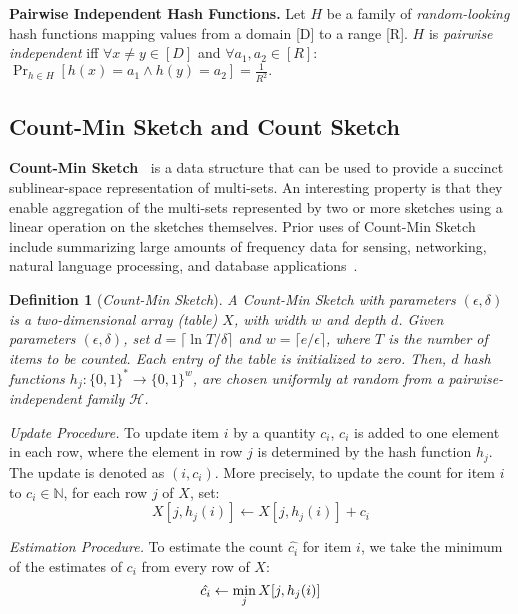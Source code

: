 \documentclass[conference]{IEEEtran}
\newcommand{\descr}[1]{\medskip \noindent \textbf{#1}}
\newcommand{\descrit}[1]{\smallskip \noindent \emph{#1}}
\newtheorem{definition}{Definition}
\begin{document}
\descr{Pairwise Independent Hash Functions.}
Let $H$ be a family of {\em random-looking} 
hash functions mapping values from a domain [D] to a range [R].
$H$ is  {\em pairwise independent} iff $\forall x \neq y \in [D]$ and 
$\forall a_1, a_2 \in [R]$: $ 
\Pr_{h \in H} \left[ h(x) = a_1 \wedge h(y) = a_2 \right] = \frac{1}{R^2}.  $

\subsection{Count-Min Sketch and Count Sketch}
\label{sec:cms}

\descr{Count-Min Sketch~\cite{cormode2005improved}} is a data structure that can be used to provide a succinct sublinear-space representation of multi-sets. An interesting property is that they enable aggregation of the multi-sets represented by two or more sketches using a linear operation on the sketches themselves. Prior uses of Count-Min Sketch include summarizing large amounts of frequency data for sensing, networking, natural language processing, and database applications~\cite{site}.


\vspace*{0.1cm}
\begin{definition}[\itshape  Count-Min Sketch]\label{def:count} 
A Count-Min Sketch with parameters $(\epsilon, \delta)$ is a two-dimensional array (table) $X$, with width $w$ and depth $d$. 
Given parameters $(\epsilon, \delta)$, set $d=\lceil \ln{T/\delta} \rceil$ and $w=\lceil e / \epsilon \rceil$, where $T$ is the number of items to be counted. Each entry of the table is initialized to zero. Then, $d$ hash functions
$ h_j:\lbrace{0,1\rbrace}^* \rightarrow \lbrace{0,1\rbrace}^w$, are chosen uniformly at random from a pairwise-independent family $\mathcal{H}$.\vspace*{-0.15cm}
\end{definition}

\descrit{Update Procedure.} To update item $i$ by a quantity $c_i$, $c_i$ is added to one element in each row, where the element in row $j$ is determined by the hash function $h_j$. The update is
denoted as $(i , c_i)$.
More precisely, to update the count for item $i$ to $c_i\in\mathbb{N}$, for each row $j$ of $X$, set: \vspace{-0.1cm} 
\[
 X[j, h_j(i)] \leftarrow X[j, h_j(i)] + c_i
\]


\descrit{Estimation Procedure.}
To estimate the count $\hat{c_i}$ for item $i$, we take the minimum of the estimates of $c_i$ from every row of $X$:\vspace{-0.1cm} 
\[
 \hat{c_i} \gets \min_{j} X[j, h_j(i)] \vspace{-0.15cm}
\]
\end{document}
